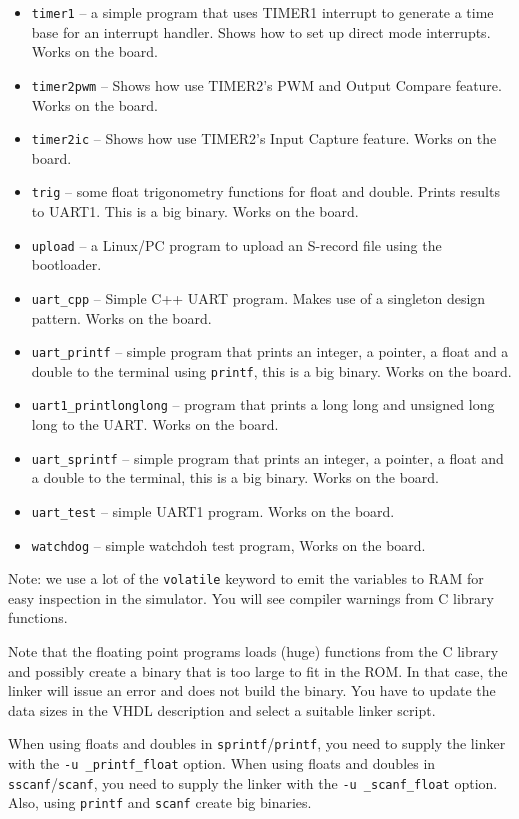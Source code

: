 \documentclass[12pt]{article}
\begin{document}
\begin{itemize}
\item \lstinline|timer1| -- a simple program that uses TIMER1 interrupt to generate a time base for an interrupt handler. Shows how to set up direct mode interrupts. Works on the board.
\item \lstinline|timer2pwm| -- Shows how use TIMER2's PWM and Output Compare feature. Works on the board.
\item \lstinline|timer2ic| -- Shows how use TIMER2's Input Capture feature. Works on the board.
\item \lstinline|trig| -- some float trigonometry functions for float and double. Prints results to UART1. This is a big binary. Works on the board.
\item \lstinline|upload| -- a Linux/PC program to upload an S-record file using the bootloader.
\item \lstinline|uart_cpp| -- Simple C++ UART program. Makes use of a singleton design pattern. Works on the board.
\item \lstinline|uart_printf| -- simple program that prints an integer, a pointer, a float and a double to the terminal using \lstinline|printf|, this is a big binary. Works on the board.
\item \lstinline|uart1_printlonglong| -- program that prints a long long and unsigned long long to the UART. Works on the board.
\item \lstinline|uart_sprintf| -- simple program that prints an integer, a pointer, a float and a double to the terminal, this is a big binary. Works on the board.
\item \lstinline|uart_test| -- simple UART1 program. Works on the board.
\item \lstinline|watchdog| -- simple watchdoh test program, Works on the board.
\end{itemize} 

Note: we use a lot of the \lstinline|volatile| keyword to emit the variables to RAM for easy inspection in the simulator. You will see compiler warnings from C library functions.

Note that the floating point programs loads (huge) functions from the C library and possibly create a binary that is too large to fit in the ROM. In that case, the linker will issue an error and does not build the binary. You have to update the data sizes in the VHDL description and select a suitable linker script.

When using floats and doubles in \lstinline|sprintf|/\lstinline|printf|, you need to supply the linker with the \lstinline|-u _printf_float| option. When using floats and doubles in \lstinline|sscanf|/\lstinline|scanf|, you need to supply the linker with the \lstinline|-u _scanf_float| option. Also, using \lstinline|printf| and \lstinline|scanf| create big binaries.
\end{document}
